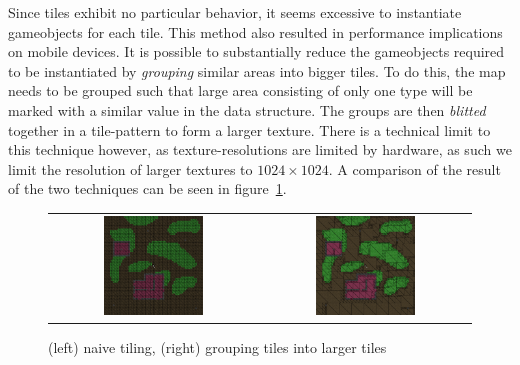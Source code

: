 Since tiles exhibit no particular behavior, it seems excessive to instantiate gameobjects for each tile.
This method also resulted in performance implications on mobile devices.
It is possible to substantially reduce the gameobjects required to be instantiated by \textit{grouping} similar areas into bigger tiles.
To do this, the map needs to be grouped such that large area consisting of only one type will be marked with a similar value in the data structure.
The groups are then \textit{blitted} together in a tile-pattern to form a larger texture.
There is a technical limit to this technique however, as texture-resolutions are limited by hardware, as such we limit the resolution of larger textures to $1024 \times 1024$.
A comparison of the result of the two techniques can be seen in figure~\ref{fig:grouped_tiling_comparison}.
\begin{figure}[H]
    \centering
    \begin{tabular}{cc}
        \includegraphics[width=0.5\textwidth]{figures/generating_levels/naive-tile.png}
        &
        \includegraphics[width=0.5\textwidth]{figures/generating_levels/grouped-tile.png}
    \end{tabular}
    \caption{(left) naive tiling, (right) grouping tiles into larger tiles}\label{fig:grouped_tiling_comparison}
\end{figure}
